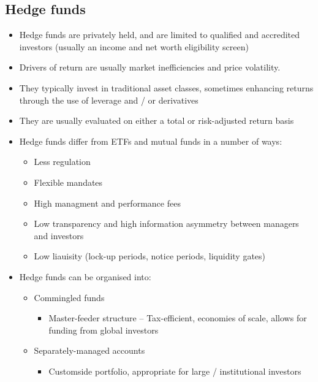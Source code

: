 \documentclass[../notes_compiled.tex]{subfiles}
\begin{document}
\subsection{Hedge funds}
\begin{itemize}
\item Hedge funds are privately held, and are limited to qualified and accredited investors (usually an income and net worth eligibility screen)
\item Drivers of return are usually market inefficiencies and price volatility.
\item They typically invest in traditional asset classes, sometimes enhancing returns through the use of leverage and / or derivatives
\item They are usually evaluated on either a total or risk-adjusted return basis
\item Hedge funds differ from ETFs and mutual funds in a number of ways:
\begin{itemize}
\item Less regulation
\item Flexible mandates
\item High managment and performance fees
\item Low transparency and high information asymmetry between managers and investors
\item Low liauisity (lock-up periods, notice periods, liquidity gates)
\end{itemize}
\item Hedge funds can be organised into:
\begin{itemize}
\item Commingled funds
\begin{itemize}
\item Master-feeder structure -- Tax-efficient, economies of scale, allows for funding from global investors
\end{itemize}
\item Separately-managed accounts
\begin{itemize}
\item Customside portfolio, appropriate for large / institutional investors
\end{itemize}
\end{itemize}
\end{itemize}
\end{document}
